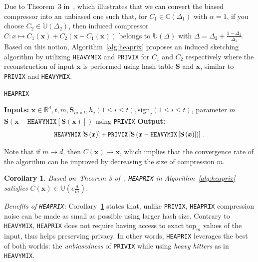 \documentclass{article}
\newtheorem{corollary}{Corollary}
\newcommand*{\Resize}[2]{\resizebox{#1}{!}{$#2$}}%
\begin{document}
Due to Theorem~$3$ in~\citet{horvath2020better}, which illustrates that we can convert the biased compressor into an unbiased one such that, for $C_1\in \mathbb{C}(\Delta_1)$ with $\alpha=1$, if you choose $C_2\in \mathbb{U}(\Delta_2)$, then induced compressor $C: x \mapsto C_1(\mathbf{x})+C_2\left(\mathbf{x}-C_1\left(\mathbf{x}\right)\right)$ belongs to $\mathbb{U}(\Delta)$ with $\Delta=\Delta_2+\frac{1-\Delta_2}{\Delta_1}$. Based on this notion, Algorithm~\ref{alg:heaprix} proposes an induced sketching algorithm by utilizing \texttt{HEAVYMIX} and \texttt{PRIVIX} for $C_1$ and $C_2$ respectively where the reconstruction of input $\mathbf{x}$ is performed using hash table $\mathbf{S}$ and $\mathbf{x}$, similar to \texttt{PRIVIX} and \texttt{HEAVYMIX}.
\begin{algorithm}[H]
\caption{\texttt{HEAPRIX} }\label{alg:heaprix}
\begin{algorithmic}[1]
\STATE \textbf{Inputs:} $\boldsymbol{x}\in\mathbb{R}^{d}, t, m, \mathbf{S}_{m\times t}, h_j (1\leq i\leq t), \text{sign}_j (1\leq i\leq t)$, parameter $m$
 $\mathbf{S}\left(\boldsymbol{x} - \texttt{HEAVYMIX}[\mathbf{S}(\boldsymbol{x})]\right)$ using \texttt{PRIVIX} 
\STATE \textbf{Output:}
\vspace{- 0.1cm}
\[ \Resize{7.4cm}{\texttt{HEAVYMIX}\left[\mathbf{S}\left(\boldsymbol{x}\right)\right]+\texttt{PRIVIX}\left[\mathbf{S}\left(\boldsymbol{x}-\texttt{HEAVYMIX}\left[\mathbf{S}\left(\boldsymbol{x}\right)\right]\right)\right]}\ .\]
\end{algorithmic}
\end{algorithm}
Note that if $m\rightarrow d$, then $C(\boldsymbol{x})\rightarrow \boldsymbol{x}$, which implies that the convergence rate of the algorithm can be improved by decreasing the size of compression $m$. 
\begin{corollary}\label{cor:small}
Based on~Theorem 3 of~\citep{horvath2020better}, \texttt{HEAPRIX} in Algorithm~\ref{alg:heaprix} satisfies $C(\boldsymbol{x})\in \mathbb{U}(c \frac{d}{m})$. 
\end{corollary}
\textit{Benefits of \texttt{HEAPRIX}:} Corollary~\ref{cor:small} states that, unlike \texttt{PRIVIX}, \texttt{HEAPRIX} compression noise can be made as small as possible using larger hash size. 
Contrary to \texttt{HEAVYMIX}, \texttt{HEAPRIX} does not require having access to exact $\text{top}_m$ values of the input, thus helps preserving privacy. 
In other words, \texttt{HEAPRIX} leverages the best of both worlds: the \emph{unbiasedness} of \texttt{PRIVIX} while using \emph{heavy hitters} as in \texttt{HEAVYMIX}.
\end{document}
